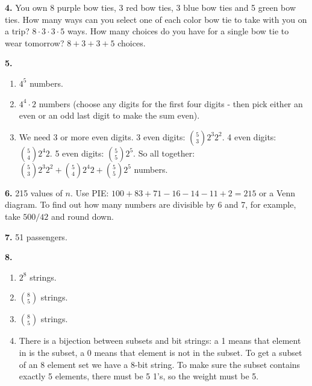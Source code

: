 \documentclass[10pt,]{book}
\theoremstyle{plain}
\theoremstyle{definition}
\theoremstyle{definition}
\theoremstyle{definition}
\numberwithin{equation}{chapter}
\begin{document}
%
\par\smallskip
\noindent\textbf{4.}\quad{}
            You own 8 purple bow ties, 3 red bow ties, 3 blue bow ties and 5 green bow ties. How many ways can you select one of each color bow tie to take with you on a trip? \(8 \cdot 3 \cdot 3 \cdot 5\) ways. How many choices do you have for a single bow tie to wear tomorrow? \(8 + 3 + 3 + 5\) choices.
\par\smallskip
\noindent\textbf{5.}\quad{}
          \leavevmode%
\begin{enumerate}[label=(\alph*)]
\item\hypertarget{li-730}{}\(4^5\) numbers.%
\item\hypertarget{li-731}{}\(4^4\cdot 2\) numbers (choose any digits for the first four digits - then pick either an even or an odd last digit to make the sum even).%
\item\hypertarget{li-732}{}
                We need 3 or more even digits. 3 even digits: \({5 \choose 3}2^3 2^2\). 4 even digits: \({5 \choose 4}2^4 2\). 5 even digits: \({5 \choose 5}2^5\). So all together: \({5 \choose 3}2^3 2^2 + {5 \choose 4}2^4 2 + {5 \choose 5}2^5\) numbers.
\end{enumerate}

%
\par\smallskip
\noindent\textbf{6.}\quad{}
            215 values of \(n\). Use PIE: \(100 + 83 + 71 - 16 - 14 -11 + 2 = 215\) or a Venn diagram. To find out how many numbers are divisible by 6 and 7, for example, take \(500/42\) and round down.
\par\smallskip
\noindent\textbf{7.}\quad{}
            51 passengers.
\par\smallskip
\noindent\textbf{8.}\quad{}
          \leavevmode%
\begin{enumerate}[label=(\alph*)]
\item\hypertarget{li-737}{}\(2^8\) strings.%
\item\hypertarget{li-738}{}\({8 \choose 5}\) strings.%
\item\hypertarget{li-739}{}\({8 \choose 5}\) strings.%
\item\hypertarget{li-740}{}
                There is a bijection between subsets and bit strings: a 1 means that element in is the subset, a 0 means that element is not in the subset. To get a subset of an 8 element set we have a 8-bit string. To make sure the subset contains exactly 5 elements, there must be 5 1's, so the weight must be 5.
\end{enumerate}
\end{document}
